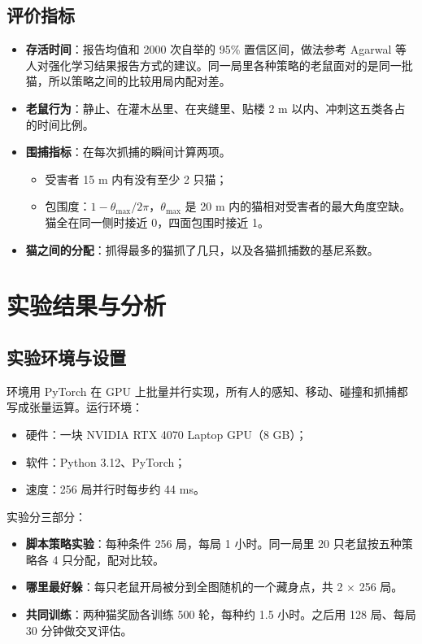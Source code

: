 \documentclass[a4paper,zihao=5,fontset=fandol,UTF8]{ctexart}
\begin{document}
\subsection{评价指标}
\begin{itemize}
  \item \textbf{存活时间}：报告均值和 2000 次自举的 95\% 置信区间，做法参考 Agarwal 等人对强化学习结果报告方式的建议\cite{agarwal2021}。同一局里各种策略的老鼠面对的是同一批猫，所以策略之间的比较用局内配对差。
  \item \textbf{老鼠行为}：静止、在灌木丛里、在夹缝里、贴楼 2 m 以内、冲刺这五类各占的时间比例。
  \item \textbf{围捕指标}：在每次抓捕的瞬间计算两项。
    \begin{itemize}
      \item 受害者 15 m 内有没有至少 2 只猫；
      \item 包围度：$1-\theta_{\max}/2\pi$，$\theta_{\max}$ 是 20 m 内的猫相对受害者的最大角度空缺。猫全在同一侧时接近 0，四面包围时接近 1。
    \end{itemize}
  \item \textbf{猫之间的分配}：抓得最多的猫抓了几只，以及各猫抓捕数的基尼系数。
\end{itemize}

\section{实验结果与分析}
\subsection{实验环境与设置}
环境用 PyTorch 在 GPU 上批量并行实现，所有人的感知、移动、碰撞和抓捕都写成张量运算。运行环境：
\begin{itemize}
  \item 硬件：一块 NVIDIA RTX 4070 Laptop GPU（8 GB）；
  \item 软件：Python 3.12、PyTorch；
  \item 速度：256 局并行时每步约 44 ms。
\end{itemize}

实验分三部分：
\begin{itemize}
  \item \textbf{脚本策略实验}：每种条件 256 局，每局 1 小时。同一局里 20 只老鼠按五种策略各 4 只分配，配对比较。
  \item \textbf{哪里最好躲}：每只老鼠开局被分到全图随机的一个藏身点，共 2 × 256 局。
  \item \textbf{共同训练}：两种猫奖励各训练 500 轮，每种约 1.5 小时。之后用 128 局、每局 30 分钟做交叉评估。
\end{itemize}
\end{document}
